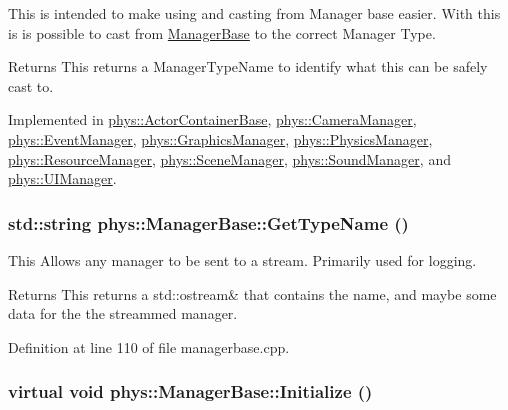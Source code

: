 This is intended to make using and casting from Manager base easier. With this is is possible to cast from \hyperlink{classphys_1_1ManagerBase}{ManagerBase} to the correct Manager Type. \begin{DoxyReturn}{Returns}
This returns a ManagerTypeName to identify what this can be safely cast to. 
\end{DoxyReturn}


Implemented in \hyperlink{classphys_1_1ActorContainerBase_aa86380fd1b18d660f68b60f075967cf8}{phys::ActorContainerBase}, \hyperlink{classphys_1_1CameraManager_a8412ea634307aa280b615a3cc7c9b739}{phys::CameraManager}, \hyperlink{classphys_1_1EventManager_a194890f7f8be5d45aa98623481482696}{phys::EventManager}, \hyperlink{classphys_1_1GraphicsManager_abf48faad2e09cd564442e66bc0473e58}{phys::GraphicsManager}, \hyperlink{classphys_1_1PhysicsManager_a4d151cd24052ef3cccde6b66b8745be6}{phys::PhysicsManager}, \hyperlink{classphys_1_1ResourceManager_a9e5468e5428f5c108c7b3c01e94eba46}{phys::ResourceManager}, \hyperlink{classphys_1_1SceneManager_af2b4f6bc50d40ffe06f6172c3d1dd02d}{phys::SceneManager}, \hyperlink{classphys_1_1SoundManager_a6815f78a6170b119e2d1d24e862ffbf8}{phys::SoundManager}, and \hyperlink{classphys_1_1UIManager_ab8fe74564ca5dc09cbe4b1cc2c007e79}{phys::UIManager}.

\hypertarget{classphys_1_1ManagerBase_a5b4c1105696b868b7858c59541af4756}{
\subsubsection[{GetTypeName}]{\setlength{\rightskip}{0pt plus 5cm}std::string phys::ManagerBase::GetTypeName ()}}
\label{d2/de3/classphys_1_1ManagerBase_a5b4c1105696b868b7858c59541af4756}


This Allows any manager to be sent to a stream. Primarily used for logging. 

\begin{DoxyReturn}{Returns}
This returns a std::ostream\& that contains the name, and maybe some data for the the streammed manager. 
\end{DoxyReturn}


Definition at line 110 of file managerbase.cpp.

\hypertarget{classphys_1_1ManagerBase_a57dd8e54e767427d5bdcc86dc66d73ed}{
\subsubsection[{Initialize}]{\setlength{\rightskip}{0pt plus 5cm}virtual void phys::ManagerBase::Initialize ()}}
\label{d2/de3/classphys_1_1ManagerBase_a57dd8e54e767427d5bdcc86dc66d73ed}


